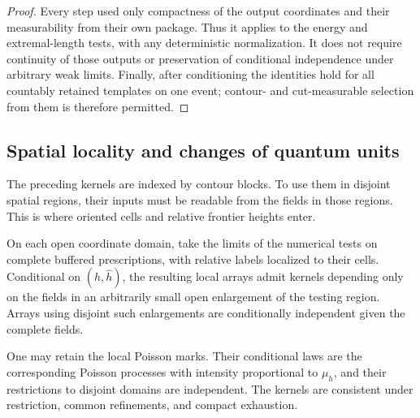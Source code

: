\begin{proof}
Every step used only compactness of the output coordinates and
their measurability from their own package.  Thus it applies to
the energy and extremal-length tests, with any deterministic
normalization.  It does not require continuity of those outputs
or preservation of conditional independence under arbitrary weak
limits.  Finally, after conditioning the identities hold for all
countably retained templates on one event; contour- and
cut-measurable selection from them is therefore permitted.
\end{proof}

\subsection{Spatial locality and changes of quantum units}

The preceding kernels are indexed by contour blocks.  To use them
in disjoint spatial regions, their inputs must be readable from
the fields in those regions.  This is where oriented cells and
relative frontier heights enter.

\begin{proposition}\label{inp:local-kernels}
On each open coordinate domain, take the limits of the numerical
tests on complete buffered prescriptions, with relative labels
localized to their cells.  Conditional on $(h,\widehat h)$, the
resulting local arrays admit kernels depending only on the fields
in an arbitrarily small open enlargement of the testing region.
Arrays using disjoint such enlargements are conditionally
independent given the complete fields.

One may retain the local Poisson marks.  Their conditional laws are
the corresponding Poisson processes with intensity proportional
to $\mu_h$, and their restrictions to disjoint domains are
independent.  The kernels are consistent under restriction,
common refinements, and compact exhaustion.
\end{proposition}

